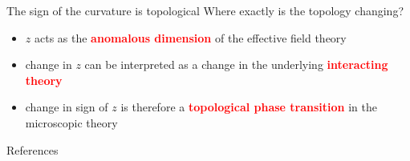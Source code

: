 \documentclass[11pt,aspectratio=169]{beamer}
\newcommand{\focus}[1]{\textcolor{red}{\bf{#1}}}
\begin{document}
\begin{frame}{The sign of the curvature is topological}
	Where exactly is the topology changing?
	\vspace*{\fill}
	\begin{itemize}
		\item \(z\) acts as the \focus{anomalous dimension} of the effective field theory\\[10pt]
		\item change in \(z\) can be interpreted as a change in the underlying \focus{interacting theory}\\[10pt]
		\item change in sign of \(z\) is therefore a \focus{topological phase transition} in the microscopic theory
	\end{itemize}
\end{frame}

\begin{frame}[allowframebreaks]{References}
\printbibliography
\end{frame}
\end{document}
